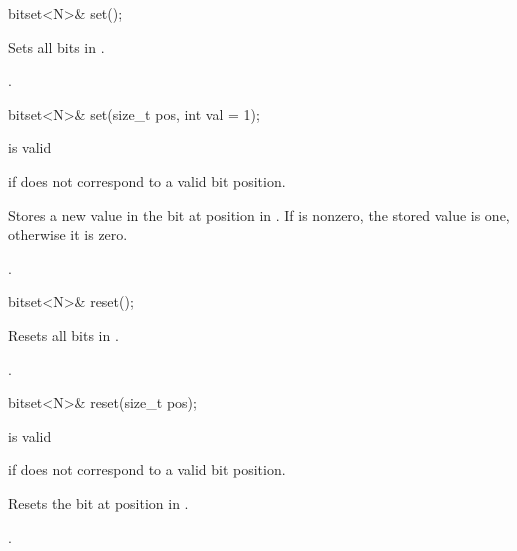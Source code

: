 \begin{itemdecl}
bitset<N>& set();
\end{itemdecl}

\begin{itemdescr}
\pnum
\effects
Sets all bits in
.

\pnum
\returns
{}.
\end{itemdescr}

\begin{itemdecl}
bitset<N>& set(size_t pos, int val = 1);
\end{itemdecl}

\begin{itemdescr}
\pnum
\requires
{} is valid

\pnum
\throws
{}
if  does not correspond to a valid bit position.%

\pnum
\effects
Stores a new value in the bit at position  in
.
If  is nonzero, the stored value is one, otherwise it is zero.

\pnum
\returns
{}.
\end{itemdescr}

\begin{itemdecl}
bitset<N>& reset();
\end{itemdecl}

\begin{itemdescr}
\pnum
\effects
Resets all bits in
.

\pnum
\returns
{}.
\end{itemdescr}

\begin{itemdecl}
bitset<N>& reset(size_t pos);
\end{itemdecl}

\begin{itemdescr}
\pnum
\requires
{} is valid

\pnum
\throws
{}
if  does not correspond to a valid bit position.
%

\pnum
\effects
Resets the bit at position  in
.

\pnum
\returns
{}.
\end{itemdescr}

